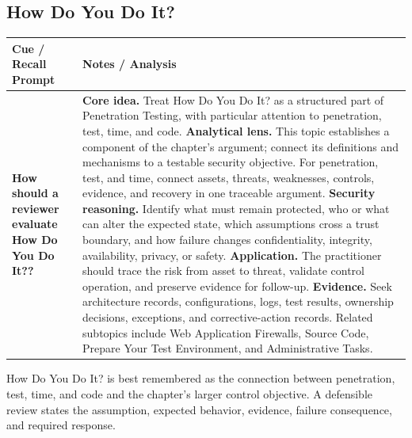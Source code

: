 \documentclass[11pt]{article}
\newcommand{\CornellHeader}{%
\rowcolor{Navy}\color{white}\bfseries Cue / Recall Prompt & \color{white}\bfseries Notes / Analysis\\\hline}
\newcommand{\CornellRow}[2]{%
\cellcolor{CueGray}\RaggedRight\textbf{#1} & \RaggedRight #2\\\hline}
\begin{document}
\subsection*{How Do You Do It?}
\begin{longtable}{>{\RaggedRight\arraybackslash}p{}|>{\RaggedRight\arraybackslash}p{}}
\CornellHeader
\CornellRow{How should a reviewer evaluate How Do You Do It??}{\textbf{Core idea.} Treat How Do You Do It? as a structured part of Penetration Testing, with particular attention to penetration, test, time, and code. \textbf{Analytical lens.} This topic establishes a component of the chapter's argument; connect its definitions and mechanisms to a testable security objective. For penetration, test, and time, connect assets, threats, weaknesses, controls, evidence, and recovery in one traceable argument. \textbf{Security reasoning.} Identify what must remain protected, who or what can alter the expected state, which assumptions cross a trust boundary, and how failure changes confidentiality, integrity, availability, privacy, or safety. \textbf{Application.} The practitioner should trace the risk from asset to threat, validate control operation, and preserve evidence for follow-up. \textbf{Evidence.} Seek architecture records, configurations, logs, test results, ownership decisions, exceptions, and corrective-action records. Related subtopics include Web Application Firewalls, Source Code, Prepare Your Test Environment, and Administrative Tasks.}
\end{longtable}
\begin{topicsummary}
How Do You Do It? is best remembered as the connection between penetration, test, time, and code and the chapter's larger control objective. A defensible review states the assumption, expected behavior, evidence, failure consequence, and required response.
\end{topicsummary}
\end{document}
